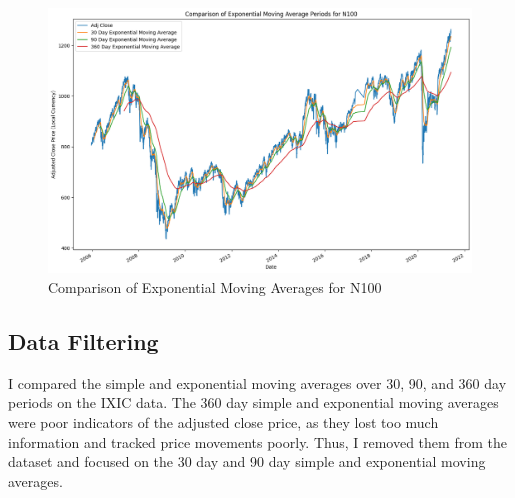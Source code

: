 \documentclass[a4paper, 11pt]{article}
\begin{document}
\begin{figure}[H]
    \begin{center}
        \includegraphics[width=1\textwidth]{Exponential Moving Averages for N100.png}
        \caption{Comparison of Exponential Moving Averages for N100}
    \end{center}
\end{figure}

\subsection{Data Filtering}
I compared the simple and exponential moving averages over 30, 90, and 360 day periods on the IXIC data. The 360 day simple and exponential moving averages were poor indicators of the adjusted close price, as they lost too much information and tracked price movements poorly. Thus, I removed them from the dataset and focused on the 30 day and 90 day simple and exponential moving averages.
\end{document}
